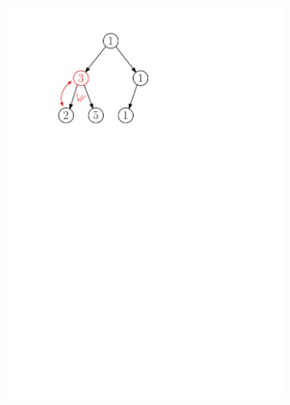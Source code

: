 \begin{figure}[h]
\begin{subfigure}{5cm}
        \includegraphics[scale=.5]{01-grafalgo/images/ch01_odebirani_4}
    \end{subfigure}
    \begin{subfigure}{5cm}

\end{subfigure}
\end{figure}
